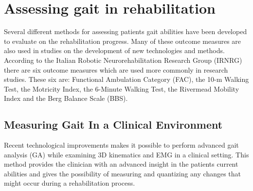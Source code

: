 \section{Assessing gait in rehabilitation}

Several different methods for assessing patients gait abilities have been developed to evaluate on the rehabilitation progress. Many of these outcome measures are also used in studies on the development of new technologies and methods. According to the Italian Robotic Neurorehabilitation Research Group (IRNRG) there are six outcome measures which are used more commonly in research studies. These six are: Functional Ambulation Category (FAC), the 10-m Walking Test, the Motricity Index, the 6-Minute Walking Test, the Rivermead Mobility Index and the Berg Balance Scale (BBS). \cite{Sandrini2018}

\subsection{Measuring Gait In a Clinical Environment}

Recent technological improvements makes it possible to perform advanced gait analysis (GA) while examining 3D kinematics and EMG in a clinical setting. This method provides the clinician with an advanced insight in the patients current abilities and gives the possibility of measuring and quantizing any changes that might occur during a rehabilitation process. \cite{Sandrini2018}

